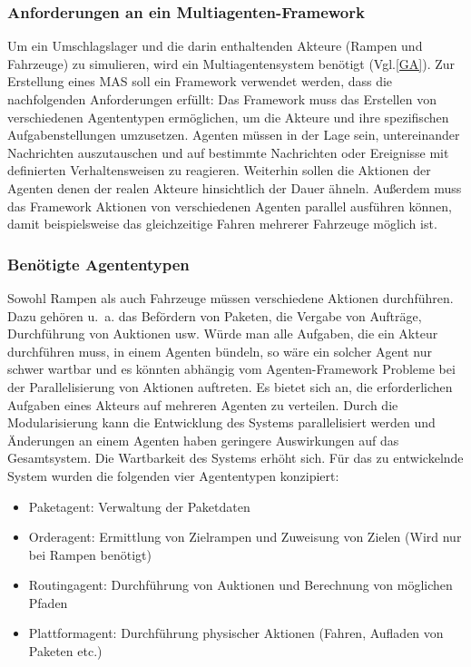 \subsubsection{Anforderungen an ein Multiagenten-Framework}
Um ein Umschlagslager und die darin enthaltenden Akteure (Rampen und Fahrzeuge) zu simulieren, wird ein Multiagentensystem benötigt (Vgl.\ref{GA}). Zur Erstellung eines MAS soll ein Framework verwendet werden, dass die nachfolgenden Anforderungen erfüllt: Das Framework muss das Erstellen von verschiedenen Agententypen ermöglichen, um die Akteure und ihre spezifischen Aufgabenstellungen umzusetzen. Agenten müssen in der Lage sein, untereinander Nachrichten auszutauschen und auf bestimmte Nachrichten oder Ereignisse mit definierten Verhaltensweisen zu reagieren. Weiterhin sollen die Aktionen der Agenten denen der realen Akteure hinsichtlich der Dauer ähneln. Außerdem muss das Framework Aktionen von verschiedenen Agenten parallel ausführen können, damit beispielsweise das gleichzeitige Fahren mehrerer Fahrzeuge möglich ist.
\subsubsection{Benötigte Agententypen}
Sowohl Rampen als auch Fahrzeuge müssen verschiedene Aktionen durchführen. Dazu gehören u.~a. das Befördern von Paketen, die Vergabe von Aufträge, Durchführung von Auktionen usw. Würde man alle Aufgaben, die ein Akteur durchführen muss, in einem Agenten bündeln, so wäre ein solcher Agent nur schwer wartbar und es könnten abhängig vom Agenten-Framework Probleme bei der Parallelisierung von Aktionen auftreten. Es bietet sich an, die erforderlichen Aufgaben eines Akteurs auf mehreren Agenten zu verteilen. Durch die Modularisierung kann die Entwicklung des Systems parallelisiert werden und Änderungen an einem Agenten haben geringere Auswirkungen auf das Gesamtsystem. Die Wartbarkeit des Systems erhöht sich. Für das zu entwickelnde System wurden die folgenden vier Agententypen konzipiert:  
\begin{itemize}
\item Paketagent: Verwaltung der Paketdaten
\item Orderagent: Ermittlung von Zielrampen und Zuweisung von Zielen (Wird nur bei Rampen benötigt)
\item Routingagent: Durchführung von Auktionen und Berechnung von möglichen Pfaden
\item Plattformagent: Durchführung physischer Aktionen (Fahren, Aufladen von Paketen etc.)
\end{itemize}
